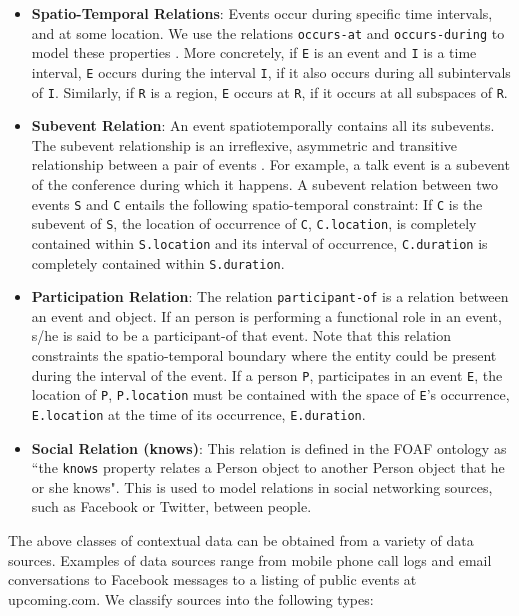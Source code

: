 \begin{itemize}
\item \textbf{Spatio-Temporal Relations}: Events occur during specific time intervals, and at some location. We use the relations \texttt{occurs-at} and \texttt{occurs-during} to model these properties \cite{gupta2011managing}. More concretely, if \texttt{E} is an event and \texttt{I} is a time interval, \texttt{E} occurs during the interval \texttt{I}, if it also occurs during all subintervals of \texttt{I}. Similarly, if \texttt{R} is a region, \texttt{E} occurs at \texttt{R}, if it occurs at all subspaces of \texttt{R}.

\item \textbf{Subevent Relation}: An event spatiotemporally contains all its subevents. The subevent relationship is an irreflexive, asymmetric and transitive relationship between a pair of events \cite{gupta2011managing}. For example, a talk event is a subevent of the conference during which it happens. A subevent relation between two events \texttt{S} and \texttt{C} entails the following spatio-temporal constraint: If \texttt{C} is the subevent of \texttt{S}, the location of occurrence of \texttt{C}, \texttt{C.location}, is completely contained within \texttt{S.location} and its interval of occurrence, \texttt{C.duration} is completely contained within \texttt{S.duration}.

\item \textbf{Participation Relation}: The relation \texttt{participant-of} is a relation between an event and object. If an person is performing a functional role in an event, s/he is said to be a participant-of that event. Note that this relation constraints the spatio-temporal boundary where the entity could be present during the interval of the event. If a person \texttt{P}, participates in an event \texttt{E}, the location of \texttt{P}, \texttt{P.location} must be contained with the space of \texttt{E}'s occurrence, \texttt{E.location} at the time of its occurrence, \texttt{E.duration}.

\item \textbf{Social Relation (knows)}: This relation is defined in the FOAF ontology \cite{brickley2010foaf} as ``the \texttt{knows} property relates a Person object to another Person object that he or she knows". This is used to model relations in social networking sources, such as Facebook or Twitter, between people.
\end{itemize}

The above classes of contextual data can be obtained from a variety of data sources. Examples of data sources range from mobile phone call logs and email conversations to Facebook messages to a listing of public events at upcoming.com. We classify sources into the following types:

